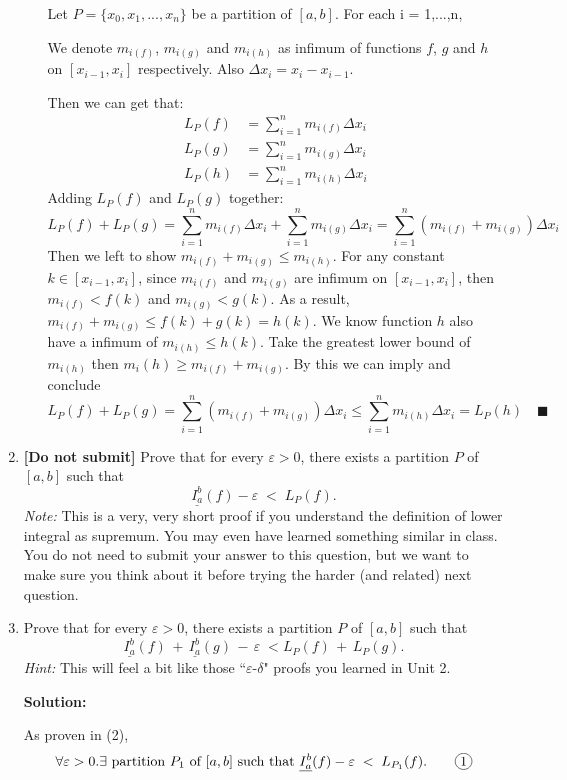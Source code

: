 \documentclass[12pt]{exam}
\newcommand*\circled[1]{\tikz[baseline=(char.base)]{
    \node[shape=circle, draw, inner sep=1pt, 
        minimum height=12pt] (char) {#1};}}
\newcommand{\e}{\varepsilon}
\begin{document}
\begin{enumerate}
\begin{enumerate}
	Let $P=\{x_0,x_1,...,x_n\}$ be a partition of $[a,b]$.
	For each i = 1,...,n,
	
	We denote $m_{i(f)}$, $m_{i(g)}$ and $m_{i(h)}$ as infimum of functions $f$, $g$ and $h$ on $[x_{i-1}, x_i]$ respectively. Also $\Delta x_i=x_i-x_{i-1}$.
	
	Then we can get that:
	\begin{align*}
	    L_{P}(f)&=\sum_{i=1}^n m_{i(f)}\Delta x_i\\
	    L_{P}(g)&=\sum_{i=1}^n m_{i(g)}\Delta x_i\\
	    L_{P}(h)&=\sum_{i=1}^n m_{i(h)}\Delta x_i
	\end{align*}
	Adding $L_{P}(f)$ and $L_{P}(g)$ together:
	$$
	    L_{P}(f)+L_{P}(g)=\sum_{i=1}^n m_{i(f)}\Delta x_i+\sum_{i=1}^n m_{i(g)}\Delta x_i=\sum_{i=1}^n (m_{i(f)}+m_{i(g)})\Delta x_i
	$$
	Then we left to show $m_{i(f)}+m_{i(g)}\leq m_{i(h)}$. For any constant $k\in[x_{i-1},x_i]$, since $m_{i(f)}$ and $m_{i(g)}$ are infimum on $[x_{i-1},x_i]$, then $m_{i(f)}<f(k)$ and $m_{i(g)}<g(k)$. As a result, $m_{i(f)}+m_{i(g)}\leq f(k)+g(k)=h(k)$. We know function $h$ also have a infimum of $m_{i(h)}\leq h(k)$. Take the greatest lower bound of $m_{i(h)}$ then $m_i{(h)}\geq m_{i(f)}+m_{i(g)}$. By this we can imply and conclude
	$$
	 L_{P}(f)+L_{P}(g)=\sum_{i=1}^n (m_{i(f)}+m_{i(g)})\Delta x_i\leq\sum_{i=1}^n m_{i(h)}\Delta x_i= L_{P}(h)\quad\blacksquare
	$$
	\end{enumerate}
	
\item   {\bf [Do not submit]}  Prove that for every $\e>0$, there exists a partition $P$ of $[a,b]$ such that 
	$$
		\underline{I_a^b}(f) - \e \; < \;  L_P(f). 
	$$
	\emph{Note:}  This is a very, very short proof if you understand the definition of lower integral as supremum.  You may even have learned something similar in class.  You do not need to submit your answer to this question, but we want to make sure you think about it before trying the harder (and related) next question.

\item  Prove that for every $\e>0$, there exists a partition $P$ of $[a,b]$ such that
	$$
		\underline{I_a^b}(f) \, + \, \underline{I_a^b}(g) \, - \, \e \; < L_P(f) \, + \, L_P(g).
	$$
	\emph{Hint:}  This will feel a bit like those ``$\e$-$\delta$" proofs you learned in Unit 2.
	
	\textbf{Solution:}
	
	As proven in (2), $$\forall \e>0.\exists \mbox{ partition } P_1 \mbox{ of } [a,b]\mbox{ such that } \underline{I_a^b}(f) - \e \; < \;  L_{P_1}(f).\qquad\circled{1}$$
	

\end{enumerate}
\end{document}

